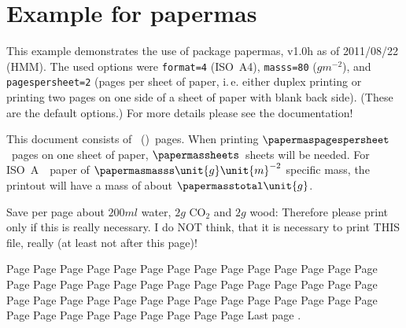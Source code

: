 \documentclass[british,a4paper]{article}[2007/10/19]%
\begin{document}

\section*{Example for papermas}

This example demonstrates the use of package\newline
\textsf{papermas}, v1.0h as of 2011/08/22 (HMM).\newline
The used options were \texttt{format=4} (ISO~A4),
\texttt{masss=80} ($\unit{g}\unit{m}^{-2}$), and\newline
\texttt{pagespersheet=2} (pages per sheet of paper,
i.\,e. either duplex printing or\newline
printing two pages on one side of a sheet of paper with blank back side).\newline
(These are the default options.)\newline
For more details please see the documentation!\newline

\bigskip

This document consists of
~()~pages.
When printing $\papermaspagespersheet$~pages on one sheet of
paper, $\papermassheets$~sheets will be needed. For
ISO~A~\papermasformat\ paper of $\papermasmasss \unit{g}\unit{m}^{-2}$
specific mass, the printout will have a mass of about
$\papermasstotal \unit{g}$.

\bigskip

\noindent Save per page about $200\unit{ml}$ water,
$2\unit{g}$ CO$_{2}$ and $2\unit{g}$ wood:\newline
Therefore please print only if this is really necessary.\newline
I do NOT think, that it is necessary to print THIS file, really\newline
(at least not after this page)!

\newpage Page \thepage
\newpage Page \thepage
\newpage Page \thepage
\newpage Page \thepage
\newpage Page \thepage
\newpage Page \thepage
\newpage Page \thepage
\newpage Page \thepage
\newpage Page \thepage
\newpage Page \thepage
\newpage Page \thepage
\newpage Page \thepage
\newpage Page \thepage
\newpage Page \thepage
\newpage Page \thepage
\newpage Page \thepage
\newpage Page \thepage
\newpage Page \thepage
\newpage Page \thepage
\newpage Page \thepage
\newpage Page \thepage
\newpage Page \thepage
\newpage Page \thepage
\newpage Page \thepage
\newpage Page \thepage
\newpage Page \thepage
\newpage Page \thepage
\newpage Page \thepage
\newpage Page \thepage
\newpage Page \thepage
\newpage Page \thepage
\newpage Page \thepage
\newpage Page \thepage
\newpage Page \thepage
\newpage Page \thepage
\newpage Page \thepage
\newpage Page \thepage
\newpage Page \thepage
\newpage Page \thepage
\newpage Page \thepage
\newpage Page \thepage
\newpage Page \thepage
\newpage Page \thepage
\newpage Page \thepage
\newpage Page \thepage
\newpage Page \thepage
\newpage Page \thepage
\newpage Page \thepage
\newpage Page \thepage
\newpage Page \thepage
\newpage Page \thepage
\newpage Last page \thepage.
\end{document}
